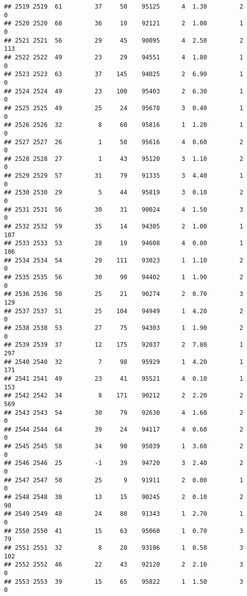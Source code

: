 \documentclass[
]{article}
\begin{document}
\begin{verbatim}
## 2519 2519  61         37     50    95125      4  1.30         2        0
## 2520 2520  60         36     10    92121      2  1.00         1        0
## 2521 2521  56         29     45    90095      4  2.50         2      113
## 2522 2522  49         23     29    94551      4  1.80         1        0
## 2523 2523  63         37    145    94025      2  6.90         1        0
## 2524 2524  49         23    100    95403      2  6.30         1        0
## 2525 2525  49         25     24    95678      3  0.40         1        0
## 2526 2526  32          8     60    95816      1  1.20         1        0
## 2527 2527  26          1     50    95616      4  0.60         2        0
## 2528 2528  27          1     43    95120      3  1.10         2        0
## 2529 2529  57         31     79    91335      3  4.40         1        0
## 2530 2530  29          5     44    95819      3  0.10         2        0
## 2531 2531  56         30     31    90024      4  1.50         3        0
## 2532 2532  59         35     14    94305      2  1.00         1      107
## 2533 2533  53         28     19    94608      4  0.80         1      106
## 2534 2534  54         29    111    93023      1  1.10         2        0
## 2535 2535  56         30     90    94402      1  1.90         2        0
## 2536 2536  50         25     21    90274      2  0.70         3      129
## 2537 2537  51         25    104    94949      1  4.20         2        0
## 2538 2538  53         27     75    94303      1  1.90         2        0
## 2539 2539  37         12    175    92037      2  7.80         1      297
## 2540 2540  32          7     98    95929      1  4.20         1      171
## 2541 2541  49         23     41    95521      4  0.10         1      153
## 2542 2542  34          8    171    90212      2  2.20         2      569
## 2543 2543  54         30     79    92630      4  1.60         2        0
## 2544 2544  64         39     24    94117      4  0.60         2        0
## 2545 2545  58         34     90    95039      1  3.60         2        0
## 2546 2546  25         -1     39    94720      3  2.40         2        0
## 2547 2547  50         25      9    91911      2  0.00         1        0
## 2548 2548  38         13     15    90245      2  0.10         2       90
## 2549 2549  48         24     80    91343      1  2.70         1        0
## 2550 2550  41         15     63    95060      1  0.70         3       79
## 2551 2551  32          8     20    93106      1  0.50         3      102
## 2552 2552  46         22     43    92120      2  2.10         3        0
## 2553 2553  39         15     65    95822      1  1.50         3        0

\end{verbatim}
\end{document}
